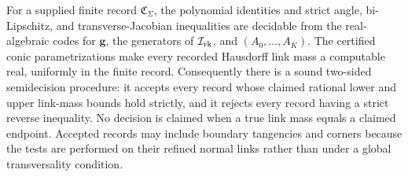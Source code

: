 For a supplied finite record \(\mathfrak C_\Sigma\), the polynomial identities and strict angle, bi-Lipschitz, and transverse-Jacobian inequalities are decidable from the real-algebraic codes for \(\mathbf g\), the generators of \(\mathcal I_{\rm rk}\), and \((A_0,\ldots,A_K)\). The certified conic parametrizations make every recorded Hausdorff link mass a computable real, uniformly in the finite record. Consequently there is a sound two-sided semidecision procedure: it accepts every record whose claimed rational lower and upper link-mass bounds hold strictly, and it rejects every record having a strict reverse inequality. No decision is claimed when a true link mass equals a claimed endpoint. Accepted records may include boundary tangencies and corners because the tests are performed on their refined normal links rather than under a global transversality condition.